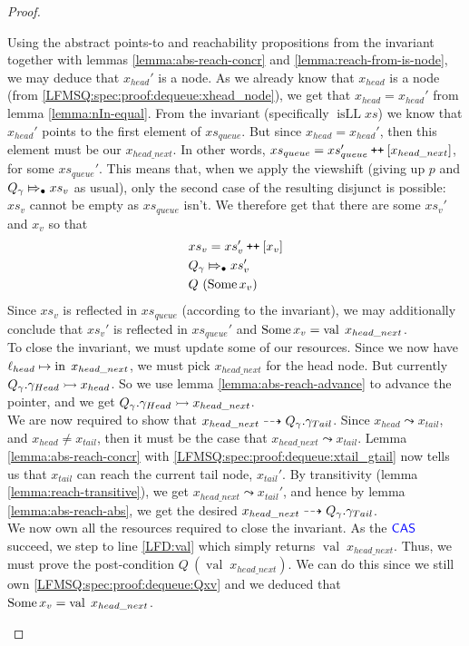 \documentclass[a4paper, 11pt]{report}
\newcommand{\isLL}{\operatorname{isLL}}
\newcommand{\nIn}[1]{\operatorname{in} \; #1}
\newcommand{\nVal}[1]{\operatorname{val} \; #1}
\newcommand{\Qg}{Q_\gname}
\newcommand\catenate{\mathbin{\text{\ttfamily\upshape ++}}}
\newcommand{\abstractstateauth}[2]{#1 \Mapsto_{\bullet} #2}
\newcommand{\reach}[2]{#1 \leadsto #2}
\newcommand{\ar}[2]{#1 \dashrightarrow #2}
\newcommand{\ap}[2]{#1 \rightarrowtail #2}
\begin{document}
\begin{proof}
\begin{itemize}
\begin{itemize}
      Using the abstract points-to and reachability propositions from the invariant together with lemmas \ref{lemma:abs-reach-concr} and \ref{lemma:reach-from-is-node}, we may deduce that $x_{head}'$ is a node. As we already know that $x_{head}$ is a node (from \ref{LFMSQ:spec:proof:dequeue:xhead_node}), we get that $x_{head} = x_{head}'$ from lemma \ref{lemma:nIn-equal}. From the invariant (specifically $\isLL xs$) we know that $x_{head}'$ points to the first element of $xs_{queue}$. But since $x_{head} = x_{head}'$, then this element must be our $x_{head\_next}$. In other words, $xs_{queue} = xs_{queue}' \catenate [x_{head\_next}]$, for some $xs_{queue}'$.
      This means that, when we apply the viewshift (giving up $p$ and $\abstractstateauth{\Qg}{xs_v}$ as usual), only the second case of the resulting disjunct is possible: $xs_v$ cannot be empty as $xs_{queue}$ isn't. We therefore get that there are some $xs_v'$ and $x_v$ so that
      \begin{align}
        &xs_v = xs_v' \catenate [x_v]\\
        &\abstractstateauth{\Qg}{xs_v'}\\
        &Q \ (\Some x_v)\label{LFMSQ:spec:proof:dequeue:Qxv}
      \end{align}
      Since $xs_v$ is reflected in $xs_{queue}$ (according to the invariant), we may additionally conclude that $xs_v'$ is reflected in $xs_{queue}'$ and $\Some x_v = \nVal{x_{head\_next}}$.\\
      To close the invariant, we must update some of our resources. Since we now have $\loc_{head} \mapsto \nIn{x_{head\_next}}$, we must pick $x_{head\_next}$ for the head node. But currently $\ap{\Qg.\gname_{Head}}{x_{head}}$. So we use lemma \ref{lemma:abs-reach-advance} to advance the pointer, and we get $\ap{\Qg.\gname_{Head}}{x_{head\_next}}$.\\
      We are now required to show that $\ar{x_{head\_next}}{\Qg.\gname_{Tail}}$. Since $\reach{x_{head}}{x_{tail}}$, and $x_{head} \neq x_{tail}$, then it must be the case that $\reach{x_{head\_next}}{x_{tail}}$. Lemma \ref{lemma:abs-reach-concr} with \ref{LFMSQ:spec:proof:dequeue:xtail_gtail} now tells us that $x_{tail}$ can reach the current tail node, $x_{tail}'$. By transitivity (lemma \ref{lemma:reach-transitive}), we get $\reach{x_{head\_next}}{x_{tail}'}$, and hence by lemma \ref{lemma:abs-reach-abs}, we get the desired $\ar{x_{head\_next}}{\Qg.\gname_{Tail}}$.\\
      We now own all the resources required to close the invariant. As the $\textsf{\color{blue} CAS}$ succeed, we step to line \ref{LFD:val} which simply returns $\nVal{x_{head\_next}}$. Thus, we must prove the post-condition $Q \ (\nVal{x_{head\_next}})$. We can do this since we still own \ref{LFMSQ:spec:proof:dequeue:Qxv} and we deduced that $\Some x_v = \nVal{x_{head\_next}}$.
    \end{itemize}


\end{itemize}
\end{proof}
\end{document}
